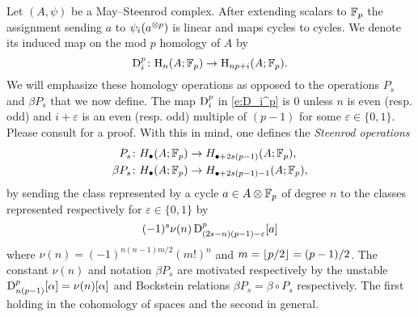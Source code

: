 Let $(A,\psi)$ be a May--Steenrod complex.
After extending scalars to ${\mathbb{F}_p}$ the assignment sending $a$ to $\psi_i(a^{\otimes p})$ is linear and maps cycles to cycles.
We denote its induced map on the mod $p$ homology of $A$ by
\begin{equation}\label{e:D_i^p}
	\mathrm{D}_i^p \colon \mathrm{H}_n(A; {\mathbb{F}_p}) \to \mathrm{H}_{np+i}(A; {\mathbb{F}_p}).
\end{equation}
We will emphasize these homology operations as opposed to the operations $P_s$ and $\beta P_s$ that we now define.
The map $\mathrm{D}_i^p$ in \eqref{e:D_i^p} is $0$ unless $n$ is even (resp. odd) and $i+\varepsilon$ is an even (resp. odd) multiple of $(p-1)$ for some $\varepsilon \in \{0,1\}$.
Please consult \cite[Proposition 2.3. (iv)]{may1970general} for a proof.
With this in mind, one defines the \textit{Steenrod operations}
\begin{align*}
	P_s \colon& H_\bullet(A; {\mathbb{F}_p}) \to H_{\bullet + 2s(p-1)}(A; {\mathbb{F}_p}), \\
	\beta P_s \colon& H_\bullet(A; {\mathbb{F}_p}) \to H_{\bullet + 2s(p-1) - 1}(A; {\mathbb{F}_p}),
\end{align*}
by sending the class represented by a cycle $a \in A \otimes {\mathbb{F}_p}$ of degree $n$ to the classes represented respectively for $\varepsilon \in \{0,1\}$ by
\begin{equation*}
	(-1)^s \nu(n) \, \mathrm{D}^p_{(2s-n)(p-1)-\varepsilon}[a]
\end{equation*}
where $\nu(n) = (-1)^{n(n-1)m/2}(m!)^n$ and $m = \lfloor p/2\rfloor = (p-1)/2$.
The constant $\nu(n)$ and notation $\beta P_s$ are motivated respectively by the unstable $\mathrm{D}_{n(p-1)}^p[\alpha] = \nu(n)[\alpha]$ and Bockstein relations $\beta P_s = \beta \circ P_s$ respectively.
The first holding in the cohomology of spaces and the second in general.